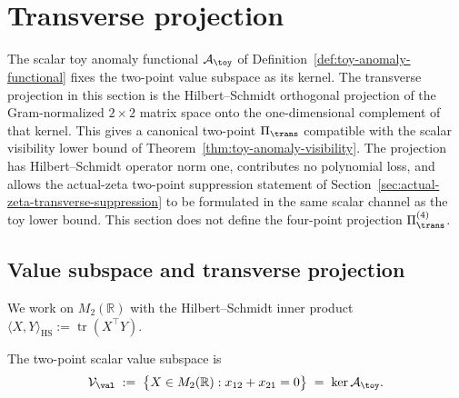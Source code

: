 
\section{Transverse projection}
\label{sec:transverse-projection}
\quad
{}\quad
{}\quad
{}\quad
{}\quad
{}
\par\medskip

The scalar toy anomaly functional \(\mathcal A_\toy\) of
Definition~\ref{def:toy-anomaly-functional} fixes the two-point value
subspace as its kernel.  The transverse projection in this section is
the Hilbert--Schmidt orthogonal projection of the Gram-normalized
\(2\times2\) matrix space onto the one-dimensional complement of that
kernel.  This gives a canonical two-point \(\Pi_\trans\) compatible
with the scalar visibility lower bound of
Theorem~\ref{thm:toy-anomaly-visibility}.  The projection has
Hilbert--Schmidt operator norm one, contributes no polynomial loss,
and allows the actual-zeta two-point suppression statement of
Section~\ref{sec:actual-zeta-transverse-suppression} to be formulated
in the same scalar channel as the toy lower bound.  This section does
not define the four-point projection \(\Pi_\trans^{(4)}\).

\subsection{Value subspace and transverse projection}
\label{subsec:transverse-projection-construction}

We work on \(M_{2}(\mathbb R)\) with the Hilbert--Schmidt inner product
\(
        \langle X,Y\rangle_{\mathrm{HS}}
        :=\operatorname{tr}(X^\top Y).
\)

\begin{definition}
\label{def:value-subspace}
The two-point scalar value subspace is
\begin{equation}
\label{eq:V-val}
        \mathcal V_\val
        \;:=\;\bigl\{X\in M_{2}(\mathbb R):x_{12}+x_{21}=0\bigr\}
        \;=\;\ker\mathcal A_\toy.
\end{equation}
\end{definition}

